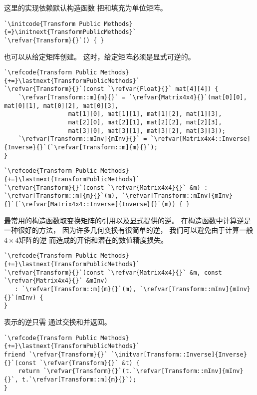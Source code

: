 这里的实现依赖默认构造函数
把和填充为单位矩阵。
\begin{lstlisting}
`\initcode{Transform Public Methods}{=}\initnext{TransformPublicMethods}`
`\refvar{Transform}{}`() { }
\end{lstlisting}

也可以从给定矩阵创建。
这时，给定矩阵必须是显式可逆的。
\begin{lstlisting}
`\refcode{Transform Public Methods}{+=}\lastnext{TransformPublicMethods}`
`\refvar{Transform}{}`(const `\refvar{Float}{}` mat[4][4]) {
    `\refvar[Transform::m]{m}{}` = `\refvar{Matrix4x4}{}`(mat[0][0], mat[0][1], mat[0][2], mat[0][3],
                  mat[1][0], mat[1][1], mat[1][2], mat[1][3],
                  mat[2][0], mat[2][1], mat[2][2], mat[2][3],
                  mat[3][0], mat[3][1], mat[3][2], mat[3][3]);
    `\refvar[Transform::mInv]{mInv}{}` = `\refvar[Matrix4x4::Inverse]{Inverse}{}`(`\refvar[Transform::m]{m}{}`);
}
\end{lstlisting}

\begin{lstlisting}
`\refcode{Transform Public Methods}{+=}\lastnext{TransformPublicMethods}`
`\refvar{Transform}{}`(const `\refvar{Matrix4x4}{}` &m) : `\refvar[Transform::m]{m}{}`(m), `\refvar[Transform::mInv]{mInv}{}`(`\refvar[Matrix4x4::Inverse]{Inverse}{}`(m)) { }
\end{lstlisting}

最常用的构造函数取变换矩阵的引用以及显式提供的逆。
在构造函数中计算逆是一种很好的方法，
因为许多几何变换有很简单的逆，
我们可以避免由于计算一般$4\times4$矩阵的逆
而造成的开销和潜在的数值精度损失。
\begin{lstlisting}
`\refcode{Transform Public Methods}{+=}\lastnext{TransformPublicMethods}`
`\refvar{Transform}{}`(const `\refvar{Matrix4x4}{}` &m, const `\refvar{Matrix4x4}{}` &mInv) 
   : `\refvar[Transform::m]{m}{}`(m), `\refvar[Transform::mInv]{mInv}{}`(mInv) {
}
\end{lstlisting}

表示的逆只需
通过交换和并返回。
\begin{lstlisting}
`\refcode{Transform Public Methods}{+=}\lastnext{TransformPublicMethods}`
friend `\refvar{Transform}{}` `\initvar[Transform::Inverse]{Inverse}{}`(const `\refvar{Transform}{}` &t) {
    return `\refvar{Transform}{}`(t.`\refvar[Transform::mInv]{mInv}{}`, t.`\refvar[Transform::m]{m}{}`);
}
\end{lstlisting}

